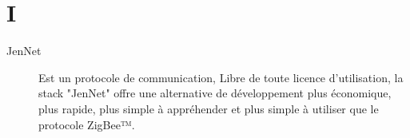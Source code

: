\section{I}

\begin{description}

\item [JenNet]
Est un protocole de communication, Libre de toute licence d'utilisation, la stack "JenNet" offre une alternative de développement plus économique, plus rapide, plus simple à appréhender et plus simple à utiliser que le protocole ZigBee™.

\end{description}